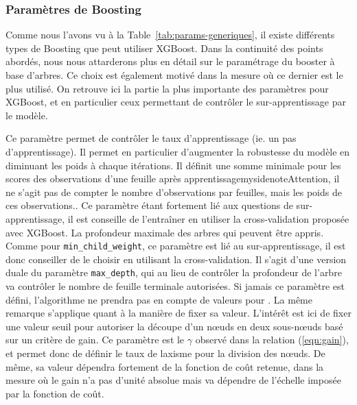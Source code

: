 \subsubsection{Paramètres de Boosting}
\label{sec:params-boosting}
Comme nous l'avons vu à la Table~\ref{tab:params-generiques}, il existe différents types de Boosting que peut utiliser XGBoost. Dans la continuité des points abordés, nous nous attarderons plus en détail sur le paramétrage du booster à base d'arbres. Ce choix est également motivé dans la mesure où ce dernier est le plus utilisé. On retrouve ici la partie la plus importante des paramètres pour XGBoost, et en particulier ceux permettant de contrôler le sur-apprentissage par le modèle.

Ce paramètre permet de contrôler le taux d'apprentissage (ie. un \og pas d'apprentissage\fg). Il permet en particulier d'augmenter la robustesse du modèle en diminuant les poids à chaque itérations.
Il définit une somme minimale pour les scores des observations d'une feuille après apprentissagemysidenote{Attention, il ne s'agit pas de compter le nombre d'observations par feuilles, mais les poids de ces observations.}. Ce paramètre étant fortement lié aux questions de sur-apprentissage, il est conseille de l'entraîner en utiliser la cross-validation proposée avec XGBoost.
La profondeur maximale des arbres qui peuvent être appris. Comme pour \texttt{min\_child\_weight}, ce paramètre est lié au sur-apprentissage, il est donc conseiller de le choisir en utilisant la cross-validation.
Il s'agit d'une version \og duale\fg{} du paramètre \texttt{max\_depth}, qui au lieu de contrôler la profondeur de l'arbre va contrôler le nombre de feuille terminale autorisées. Si jamais ce paramètre est défini, l'algorithme ne prendra pas en compte de valeurs pour . La même remarque s'applique quant à la manière de fixer sa valeur.
L'intérêt est ici de fixer une valeur seuil pour autoriser la découpe d'un n\oe uds en deux sous-n\oe uds basé sur un critère de gain. Ce paramètre est le $\gamma$ observé dans la relation (\ref{eqn:gain}), et permet donc de définir le taux de laxisme pour la division des n\oe uds. De même, sa valeur dépendra fortement de la fonction de coût retenue, dans la mesure où le gain n'a pas d'unité absolue mais va dépendre de l'échelle imposée par la fonction de coût.

